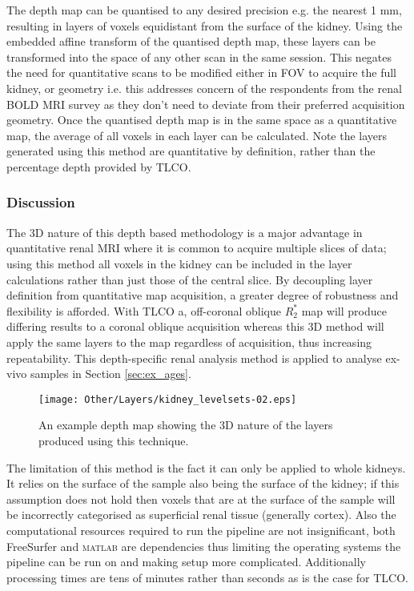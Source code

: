 The depth map can be quantised to any desired precision e.g. the nearest 1 mm, resulting in layers of voxels equidistant from the surface of the kidney. Using the embedded affine transform of the quantised depth map, these layers can be transformed into the space of any other scan in the same session. This negates the need for quantitative scans to be modified either in \ac{FOV} to acquire the full kidney, or geometry i.e. this addresses concern of the respondents from the renal \ac{BOLD} \ac{MRI} survey as they don't need to deviate from their preferred acquisition geometry. Once the quantised depth map is in the same space as a quantitative map, the average of all voxels in each layer can be calculated. Note the layers generated using this method are quantitative by definition, rather than the percentage depth provided by \ac{TLCO}.

\subsubsection{Discussion}
The 3D nature of this depth based methodology is a major advantage in quantitative renal \ac{MRI} where it is common to acquire multiple slices of data; using this method all voxels in the kidney can be included in the layer calculations rather than just those of the central slice. By decoupling layer definition from quantitative map acquisition, a greater degree of robustness and flexibility is afforded. With \ac{TLCO} a, off-coronal oblique $R_2^*$ map will produce differing results to a coronal oblique acquisition whereas this 3D method will apply the same layers to the map regardless of acquisition, thus increasing repeatability. This depth-specific renal analysis method is applied to analyse ex-vivo samples in Section \ref{sec:ex_ages}.

\begin{figure}[H]
	\centering
	\texttt{[image: Other/Layers/kidney\_levelsets-02.eps]}
	\caption{An example depth map showing the 3D nature of the layers produced using this technique.}
	\label{fig:ex_layers_kidney}
\end{figure}

The limitation of this method is the fact it can only be applied to whole kidneys. It relies on the surface of the sample also being the surface of the kidney; if this assumption does not hold then voxels that are at the surface of the sample will be incorrectly categorised as superficial renal tissue (generally cortex). Also the computational resources required to run the pipeline are not insignificant, both FreeSurfer and \textsc{matlab} are dependencies thus limiting the operating systems the pipeline can be run on and making setup more complicated. Additionally processing times are tens of minutes rather than seconds as is the case for \ac{TLCO}.

